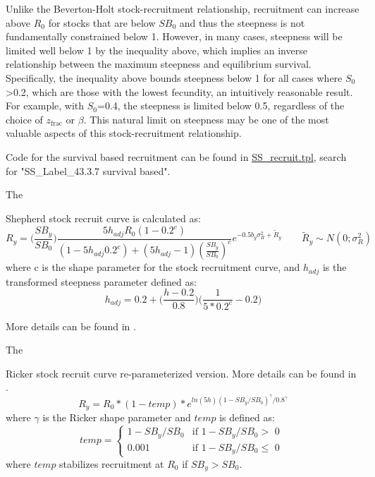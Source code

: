 Unlike the Beverton-Holt stock-recruitment relationship, recruitment can increase above $R_0$ for stocks that are below $SB_0$ and thus the steepness is not fundamentally constrained below 1. However, in many cases, steepness will be limited well below 1 by the inequality above, which implies an inverse relationship between the maximum steepness and equilibrium survival. Specifically, the inequality above bounds steepness below 1 for all cases where $S_0$>0.2, which are those with the lowest fecundity, an intuitively reasonable result. For example, with $S_0$=0.4, the steepness is limited below 0.5, regardless of the choice of $z_{\text{frac}}$ or $\beta$. This natural limit on steepness may be one of the most valuable aspects of this stock-recruitment relationship.

Code for the survival based recruitment can be found in \href{https://github.com/nmfs-stock-synthesis/stock-synthesis/blob/main/SS_recruit.tpl}{SS\_recruit.tpl}, search for "SS\_Label\_43.3.7  survival based".

\hypertarget{Shepherd}{The} Shepherd stock recruit curve is calculated as:
\begin{equation}
R_y = \bigg(\frac{SB_y}{SB_0}\bigg)\frac{5h_{adj}R_0(1-0.2^c)}{(1-5h_{adj}0.2^c)+(5h_{adj}-1)(\frac{SB_y}{SB_0})^c}e^{-0.5b_y\sigma^2_R+\tilde{R}_y}\qquad \tilde{R}_y\sim N(0;\sigma^2_R)
\end{equation}
where c is the shape parameter for the stock recruitment curve, and $h_{adj}$ is the transformed steepness parameter defined as:
\begin{equation}
h_{adj}=0.2+\bigg(\frac{h-0.2}{0.8}\bigg)\bigg(\frac{1}{5*0.2^c}-0.2\bigg)
\end{equation}

More details can be found in \citet{punt-extending-2019}.


\hypertarget{Ricker2}{The} Ricker stock recruit curve re-parameterized version. More details can be found in \citet{punt-extending-2019}.
\begin{equation}
R_y = R_0*(1-temp)*e^{ln(5h)(1-SB_y/SB_0)^{\gamma}/0.8^{\gamma}}
\end{equation}
where $\gamma$ is the Ricker shape parameter and $temp$ is defined as:
\begin{equation}
temp = 
\begin{cases}
1-SB_y/SB_0 & \text{if $1-SB_y/SB_0 >$ 0 }\\
0.001 & \text{if $1-SB_y/SB_0 \leq$ 0}
\end{cases}		
\end{equation}
where $temp$ stabilizes recruitment at $R_0$ if $SB_y > SB_0$. 


